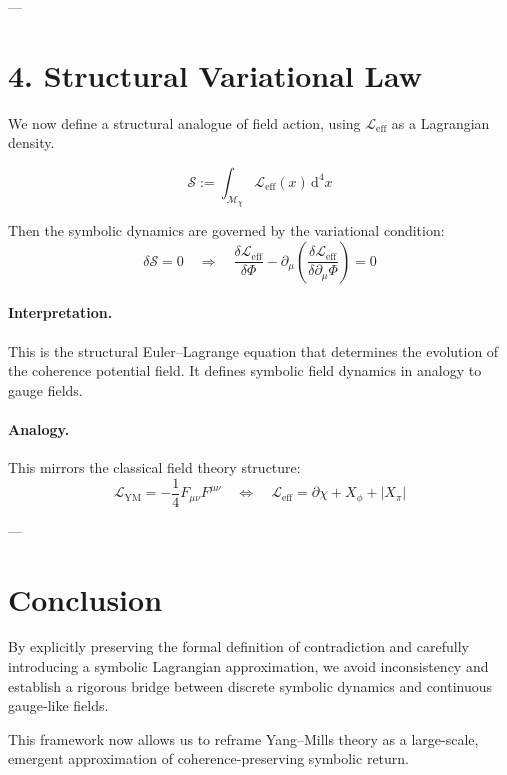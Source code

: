 ---

\section{4. Structural Variational Law}
\label{sec:structural-variational}

We now define a structural analogue of field action, using $\mathcal{L}_{\text{eff}}$ as a Lagrangian density.

\begin{equation}
\mathcal{S} := \int_{\mathcal{M}_\chi} \mathcal{L}_{\text{eff}}(x) \, \mathrm{d}^4x
\end{equation}

Then the symbolic dynamics are governed by the variational condition:
\[
\delta \mathcal{S} = 0 \quad \Rightarrow \quad 
\frac{\delta \mathcal{L}_{\text{eff}}}{\delta \Phi} - \partial_\mu \left( \frac{\delta \mathcal{L}_{\text{eff}}}{\delta \partial_\mu \Phi} \right) = 0
\]

\paragraph{Interpretation.}
This is the structural Euler–Lagrange equation that determines the evolution of the coherence potential field. It defines symbolic field dynamics in analogy to gauge fields.

\paragraph{Analogy.}
This mirrors the classical field theory structure:
\[
\mathcal{L}_{\text{YM}} = -\frac{1}{4} F_{\mu\nu} F^{\mu\nu}
\quad \Leftrightarrow \quad 
\mathcal{L}_{\text{eff}} = \partial\chi + X_\phi + |X_\pi|
\]

---

\section{Conclusion}
\label{sec:conclusion}

By explicitly preserving the formal definition of contradiction and carefully introducing a symbolic Lagrangian approximation, we avoid inconsistency and establish a rigorous bridge between discrete symbolic dynamics and continuous gauge-like fields.

This framework now allows us to reframe Yang–Mills theory as a large-scale, emergent approximation of coherence-preserving symbolic return.

